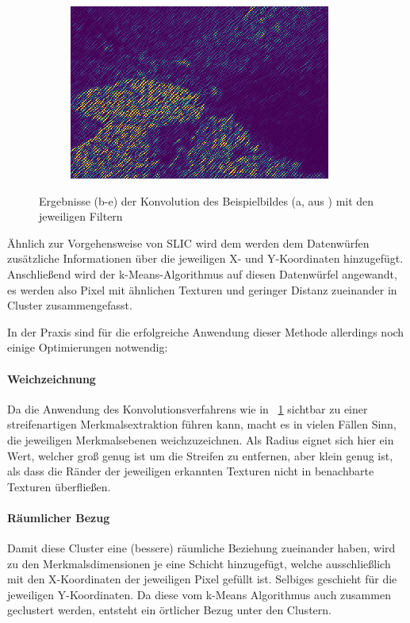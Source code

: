\begin{figure}[h!]
\begin{subfigure}[t]{0.32\textwidth}
		\includegraphics[width=\textwidth,keepaspectratio]{images/gen/GEN_tsugf_filterbank_101027_4.png}
		\subcaption{}
	\end{subfigure}
	\hfill
	\begin{subfigure}[t]{0.32\textwidth}
		\hfill
	\end{subfigure}
	\caption{Ergebnisse (b-e) der Konvolution des Beispielbildes (a, aus \cite{bsd500}) mit den jeweiligen Filtern}
	\label{fig:tsugf_101027_raw}
\end{figure}

Ähnlich zur Vorgehensweise von SLIC wird dem werden dem Datenwürfen zusätzliche Informationen über die jeweiligen X- und Y-Koordinaten hinzugefügt. Anschließend wird der k-Means-Algorithmus auf diesen Datenwürfel angewandt, es werden also Pixel mit ähnlichen Texturen und geringer Distanz zueinander in Cluster zusammengefasst.

In der Praxis sind für die erfolgreiche Anwendung dieser Methode allerdings noch einige Optimierungen notwendig: \cite{mathworks_15}

\paragraph{Weichzeichnung}
Da die Anwendung des Konvolutionsverfahrens wie in \figurename~\ref{fig:tsugf_101027_raw} sichtbar zu einer streifenartigen Merkmalsextraktion führen kann, macht es in vielen Fällen Sinn, die jeweiligen Merkmalsebenen weichzuzeichnen. Als Radius eignet sich hier ein Wert, welcher groß genug ist um die Streifen zu entfernen, aber klein genug ist, als dass die Ränder der jeweiligen erkannten Texturen nicht in benachbarte Texturen überfließen.
\paragraph{Räumlicher Bezug}
Damit diese Cluster eine (bessere) räumliche Beziehung zueinander haben, wird zu den Merkmalsdimensionen je eine Schicht hinzugefügt, welche ausschließlich mit den X-Koordinaten der jeweiligen Pixel gefüllt ist. Selbiges geschieht für die jeweiligen Y-Koordinaten. Da diese vom k-Means Algorithmus auch zusammen geclustert werden, entsteht ein örtlicher Bezug unter den Clustern.
